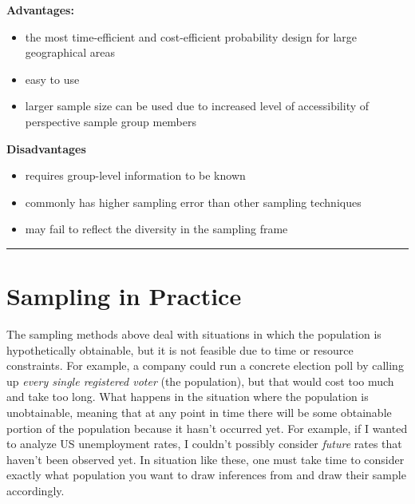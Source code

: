 \documentclass[
]{book}
\begin{document}
\textbf{Advantages:}

\begin{itemize}
\item
  the most time-efficient and cost-efficient probability design for large geographical areas
\item
  easy to use
\item
  larger sample size can be used due to increased level of accessibility of perspective sample group members
\end{itemize}

\textbf{Disadvantages}

\begin{itemize}
\item
  requires group-level information to be known
\item
  commonly has higher sampling error than other sampling techniques
\item
  may fail to reflect the diversity in the sampling frame
\end{itemize}

\begin{center}\rule{0.5\linewidth}{0.5pt}\end{center}

\hypertarget{sampling-in-practice}{%
\section{Sampling in Practice}\label{sampling-in-practice}}

The sampling methods above deal with situations in which the population is hypothetically obtainable, but it is not feasible due to time or resource constraints. For example, a company could run a concrete election poll by calling up \emph{every single registered voter} (the population), but that would cost too much and take too long. What happens in the situation where the population is unobtainable, meaning that at any point in time there will be some obtainable portion of the population because it hasn't occurred yet. For example, if I wanted to analyze US unemployment rates, I couldn't possibly consider \emph{future} rates that haven't been observed yet. In situation like these, one must take time to consider exactly what population you want to draw inferences from and draw their sample accordingly.
\end{document}
